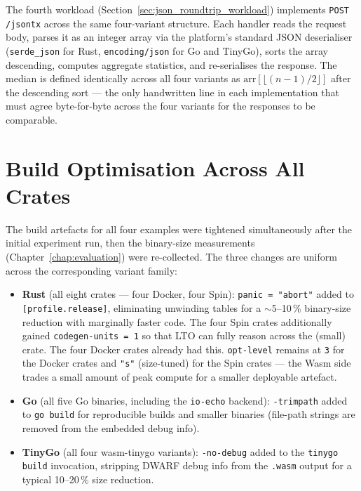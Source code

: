 \begin{sloppypar}
The fourth workload (Section~\ref{sec:json_roundtrip_workload}) implements \texttt{POST /jsontx} across the same four-variant structure. Each handler reads the request body, parses it as an integer array via the platform's standard \acs{JSON} deserialiser (\texttt{serde\_json} for Rust, \texttt{encoding/json} for Go and TinyGo), sorts the array descending, computes aggregate statistics, and re-serialises the response. The median is defined identically across all four variants as $\mathrm{arr}[\lfloor(n-1)/2\rfloor]$ after the descending sort --- the only handwritten line in each implementation that must agree byte-for-byte across the four variants for the responses to be comparable.
\end{sloppypar}

\section{Build Optimisation Across All Crates}
\label{sec:impl_build_flags}

The build artefacts for all four examples were tightened simultaneously after the initial experiment run, then the binary-size measurements (Chapter~\ref{chap:evaluation}) were re-collected. The three changes are uniform across the corresponding variant family:

\begin{itemize}
    \item \begin{sloppypar}\textbf{Rust} (all eight crates --- four Docker, four Spin): \texttt{panic = "abort"} added to \texttt{[profile.release]}, eliminating unwinding tables for a $\sim$5--10\,\% binary-size reduction with marginally faster code. The four Spin crates additionally gained \texttt{codegen-units = 1} so that \acs{LTO} can fully reason across the (small) crate. The four Docker crates already had this. \texttt{opt-level} remains at \texttt{3} for the Docker crates and \texttt{"s"} (size-tuned) for the Spin crates --- the Wasm side trades a small amount of peak compute for a smaller deployable artefact.\end{sloppypar}
    \item \begin{sloppypar}\textbf{Go} (all five Go binaries, including the \texttt{io-echo} backend): \texttt{-trimpath} added to \texttt{go build} for reproducible builds and smaller binaries (file-path strings are removed from the embedded debug info).\end{sloppypar}
    \item \begin{sloppypar}\textbf{TinyGo} (all four wasm-tinygo variants): \texttt{-no-debug} added to the \texttt{tinygo build} invocation, stripping \acs{DWARF} debug info from the \texttt{.wasm} output for a typical 10--20\,\% size reduction.\end{sloppypar}
\end{itemize}

